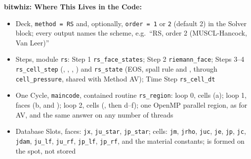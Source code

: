 \documentclass[11pt,addpoints]{exam}
\begin{document}
\begin{tcolorbox}[breakable]
\textbf{bitwhiz: Where This Lives in the Code:}\vspace{.5em}
\begin{itemize}
\item Deck, \hspace{3mm} \texttt{method = RS} \hspace{2mm} and, optionally, \hspace{2mm} \texttt{order = 1} or \texttt{2} (default 2) in the Solver block; \hspace{2mm} every output names the scheme, e.g.\ ``RS, order 2 (MUSCL-Hancock, Van Leer)''\vspace{.5em}
\item Steps, \hspace{3mm} module \texttt{rs}: \hspace{2mm} Step 1 \bm{$\rightarrow$} \texttt{rs\_face\_states}; \hspace{2mm} Step 2 \bm{$\rightarrow$} \texttt{riemann\_face}; \hspace{2mm} Steps 3--4 \bm{$\rightarrow$} \texttt{rs\_cell\_step} (\bm{$\rho$}, , , ) and \texttt{rs\_state} (EOS, spall rule and , through \texttt{cell\_pressure}, shared with Method AV); \hspace{2mm} Time Step \bm{$\rightarrow$} \texttt{rs\_cell\_dt}\vspace{.5em}
\item One Cycle, \hspace{3mm} \texttt{maincode}, contained routine \texttt{rs\_region}: loop 0, cells (a); loop 1, faces (b, and ); loop 2, cells (, then d--f); one OpenMP parallel region, as for AV, and the same answer on any number of threads\vspace{.5em}
\item Database Slots, \hspace{3mm} faces:  \texttt{jx}, \hspace{1mm}  \texttt{ju\_star}, \hspace{1mm}  \texttt{jp\_star}; \hspace{3mm} cells:  \texttt{jm}, \hspace{1mm} \bm{$\rho$} \texttt{jrho}, \hspace{1mm}  \texttt{juc}, \hspace{1mm}  \texttt{je}, \hspace{1mm}  \texttt{jp}, \hspace{1mm}  \texttt{jc}, \hspace{1mm}  \texttt{jdam}, \hspace{1mm}  \texttt{ju\_lf}, \texttt{ju\_rf}, \texttt{jp\_lf}, \texttt{jp\_rf}, and the material constants; \hspace{2mm}  is formed on the spot, not stored\vspace{.5em}

\end{itemize}
\end{tcolorbox}
\end{document}
